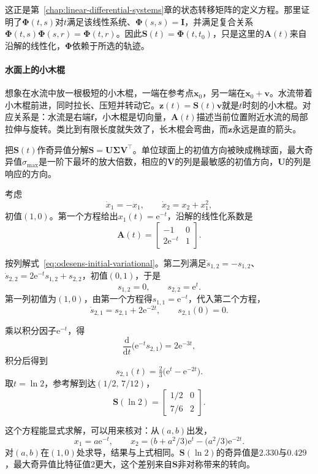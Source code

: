 这正是第~\ref{chap:linear-differential-systems}章的状态转移矩阵的定义方程。那里证明了$\bm{\Phi}(t,s)$对$t$满足该线性系统、$\bm{\Phi}(s,s)=\bm{I}$，并满足复合关系$\bm{\Phi}(t,s)\bm{\Phi}(s,r)=\bm{\Phi}(t,r)$。因此$\bm{S}(t)=\bm{\Phi}(t,t_0)$，只是这里的$\bm{A}(t)$来自沿解的线性化，$\bm{\Phi}$依赖于所选的轨迹。

\paragraph{水面上的小木棍}
想象在水流中放一根极短的小木棍，一端在参考点$\bm{x}_0$，另一端在$\bm{x}_0+\bm{v}$。水流带着小木棍前进，同时拉长、压短并转动它。$\bm{z}(t)=\bm{S}(t)\bm{v}$就是$t$时刻的小木棍。对应关系是：水流是右端$\bm{f}$，小木棍是切向量，$\bm{A}(t)$描述当前位置附近水流的局部拉伸与旋转。类比到有限长度就失效了，长木棍会弯曲，而$\bm{z}$永远是直的箭头。

把$\bm{S}(t)$作奇异值分解$\bm{S}=\bm{U}\bm{\Sigma}\bm{V}^{\top}$。单位球面上的初值方向被映成椭球面，最大奇异值$\sigma_{\max}$是一阶下最坏的放大倍数，相应的$\bm{V}$的列是最敏感的初值方向，$\bm{U}$的列是响应的方向。

\begin{example}[可以手算的二维系统]
\label{ex:odesens-planar}
考虑
\[
 \dot{x}_1=-x_1,\qquad \dot{x}_2=x_2+x_1^2,
\]
初值$(1,0)$。第一个方程给出$x_1(t)=\mathrm{e}^{-t}$，沿解的线性化系数是
\[
 \bm{A}(t)=\begin{bmatrix}-1&0\\2\mathrm{e}^{-t}&1\end{bmatrix}.
\]

按列解式~\eqref{eq:odesens-initial-variational}。第二列满足$\dot{s}_{1,2}=-s_{1,2}$、$\dot{s}_{2,2}=2\mathrm{e}^{-t}s_{1,2}+s_{2,2}$，初值$(0,1)$，于是
\[
 s_{1,2}=0,\qquad s_{2,2}=\mathrm{e}^{t}.
\]
第一列初值为$(1,0)$，由第一个方程得$s_{1,1}=\mathrm{e}^{-t}$，代入第二个方程，
\[
 \dot{s}_{2,1}=s_{2,1}+2\mathrm{e}^{-2t},\qquad s_{2,1}(0)=0.
\]

乘以积分因子$\mathrm{e}^{-t}$，得
\[
 \frac{\mathrm{d}}{\mathrm{d}t}\bigl(\mathrm{e}^{-t}s_{2,1}\bigr)=2\mathrm{e}^{-3t},
\]
积分后得到
\[
 s_{2,1}(t)=\tfrac23\bigl(\mathrm{e}^{t}-\mathrm{e}^{-2t}\bigr).
\]
取$t=\ln2$，参考解到达$(1/2,\,7/12)$，
\[
 \bm{S}(\ln2)=\begin{bmatrix}1/2&0\\7/6&2\end{bmatrix}.
\]

这个方程能显式求解，可以用来核对：从$(a,b)$出发，
\[
 x_1=a\mathrm{e}^{-t},\qquad x_2=\bigl(b+a^2/3\bigr)\mathrm{e}^{t}-\bigl(a^2/3\bigr)\mathrm{e}^{-2t}.
\]
对$(a,b)$在$(1,0)$处求导，结果与上式相同。$\bm{S}(\ln2)$的奇异值是$2.330$与$0.429$，最大奇异值比特征值$2$更大，这个差别来自$\bm{S}$非对称带来的转向。
\end{example}

